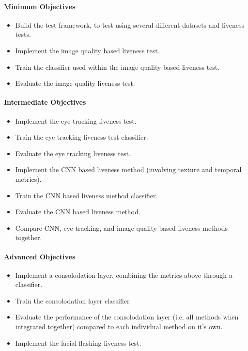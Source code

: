 \documentclass{article}
\begin{document}
    \paragraph{Minimum Objectives}
        \begin{itemize}
            \item Build the test framework, to test using several different datasets and liveness tests.
            \item Implement the image quality based liveness test.
            \item Train the classifier used within the image quality based liveness test.
            \item Evaluate the image quality liveness test.
        \end{itemize}
    \paragraph{Intermediate Objectives}
        \begin{itemize}
            \item Implement the eye tracking liveness test.
            \item Train the eye tracking liveness test classifier.
            \item Evaluate the eye tracking liveness test.
            \item Implement the CNN based liveness method (involving texture and temporal metrics).
            \item Train the CNN based liveness method classifier.
            \item Evaluate the CNN based liveness method.
            \item Compare CNN, eye tracking, and image quality based liveness methods together.
        \end{itemize}
    \paragraph{Advanced Objectives}
        \begin{itemize}
            \item Implement a consolodation layer, combining the metrics above through a classifier.
            \item Train the consolodation layer classifier
            \item Evaluate the performance of the consolodation layer (i.e. all methods when integrated together) compared to each individual method on it's own.
            \item Implement the facial flashing liveness test.
        \end{itemize}
\end{document}
